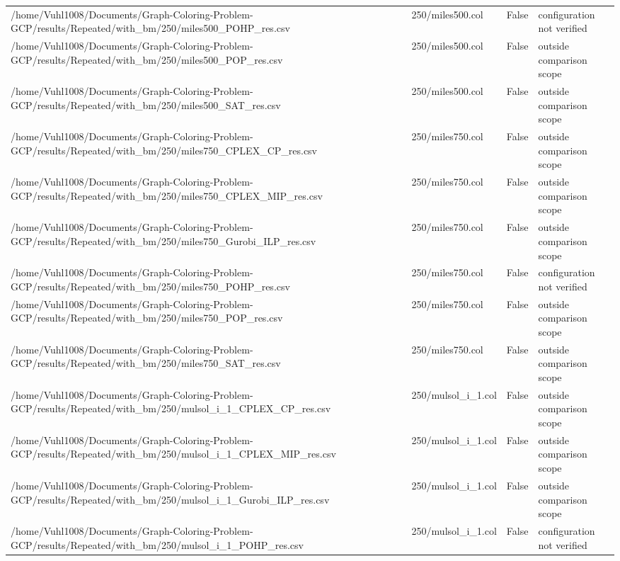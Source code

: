 \begin{table}[htbp]
\begin{tabular}{llll}
/home/Vuhl1008/Documents/Graph-Coloring-Problem-GCP/results/Repeated/with\_bm/250/miles500\_POHP\_res.csv & 250/miles500.col & False & configuration not verified \\
/home/Vuhl1008/Documents/Graph-Coloring-Problem-GCP/results/Repeated/with\_bm/250/miles500\_POP\_res.csv & 250/miles500.col & False & outside comparison scope \\
/home/Vuhl1008/Documents/Graph-Coloring-Problem-GCP/results/Repeated/with\_bm/250/miles500\_SAT\_res.csv & 250/miles500.col & False & outside comparison scope \\
/home/Vuhl1008/Documents/Graph-Coloring-Problem-GCP/results/Repeated/with\_bm/250/miles750\_CPLEX\_CP\_res.csv & 250/miles750.col & False & outside comparison scope \\
/home/Vuhl1008/Documents/Graph-Coloring-Problem-GCP/results/Repeated/with\_bm/250/miles750\_CPLEX\_MIP\_res.csv & 250/miles750.col & False & outside comparison scope \\
/home/Vuhl1008/Documents/Graph-Coloring-Problem-GCP/results/Repeated/with\_bm/250/miles750\_Gurobi\_ILP\_res.csv & 250/miles750.col & False & outside comparison scope \\
/home/Vuhl1008/Documents/Graph-Coloring-Problem-GCP/results/Repeated/with\_bm/250/miles750\_POHP\_res.csv & 250/miles750.col & False & configuration not verified \\
/home/Vuhl1008/Documents/Graph-Coloring-Problem-GCP/results/Repeated/with\_bm/250/miles750\_POP\_res.csv & 250/miles750.col & False & outside comparison scope \\
/home/Vuhl1008/Documents/Graph-Coloring-Problem-GCP/results/Repeated/with\_bm/250/miles750\_SAT\_res.csv & 250/miles750.col & False & outside comparison scope \\
/home/Vuhl1008/Documents/Graph-Coloring-Problem-GCP/results/Repeated/with\_bm/250/mulsol\_i\_1\_CPLEX\_CP\_res.csv & 250/mulsol\_i\_1.col & False & outside comparison scope \\
/home/Vuhl1008/Documents/Graph-Coloring-Problem-GCP/results/Repeated/with\_bm/250/mulsol\_i\_1\_CPLEX\_MIP\_res.csv & 250/mulsol\_i\_1.col & False & outside comparison scope \\
/home/Vuhl1008/Documents/Graph-Coloring-Problem-GCP/results/Repeated/with\_bm/250/mulsol\_i\_1\_Gurobi\_ILP\_res.csv & 250/mulsol\_i\_1.col & False & outside comparison scope \\
/home/Vuhl1008/Documents/Graph-Coloring-Problem-GCP/results/Repeated/with\_bm/250/mulsol\_i\_1\_POHP\_res.csv & 250/mulsol\_i\_1.col & False & configuration not verified \\

\end{tabular}
\end{table}
